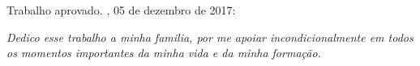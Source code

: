 \documentclass[12pt,	openright, twoside,	a4paper, english, french, spanish, brazil]{abntex2}
\begin{document}
%
% 
%
\begin{folhadeaprovacao}

  \begin{center}
    {\ABNTEXchapterfont\large\imprimirautor}

    \vspace*{\fill}\vspace*{\fill}
    \begin{center}
      \ABNTEXchapterfont\bfseries\Large\imprimirtitulo
    \end{center}
    \vspace*{\fill}
    
    \hspace{.45\textwidth}
    \begin{minipage}{.5\textwidth}
        \imprimirpreambulo
    \end{minipage}%
    \vspace*{\fill}
   \end{center}
        
   Trabalho aprovado. \imprimirlocal, 05 de dezembro de 2017:

      
   \begin{center}
    \vspace*{0.5cm}
    {\large\imprimirlocal}
    \par
    {\large\imprimirdata}
    \vspace*{1cm}
  \end{center}
  
\end{folhadeaprovacao}

\begin{dedicatoria}
   \vspace*{\fill}
   \centering
   \noindent
   \textit{ Dedico esse trabalho a minha familia, por me apoiar incondicionalmente em todos os momentos importantes da minha vida e da minha formação.} \vspace*{\fill}
\end{dedicatoria}
\end{document}

